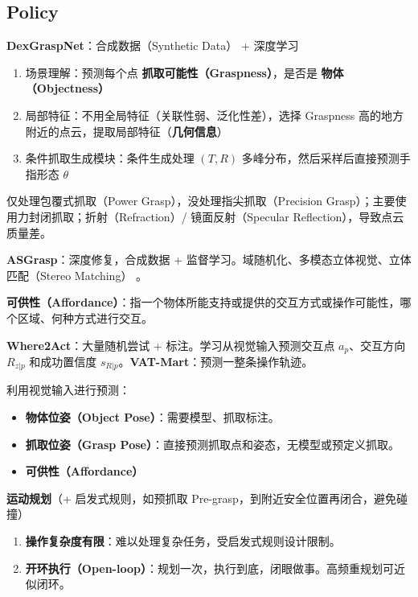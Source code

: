 \documentclass[
  8pt]{extarticle}
\author{}
\date{}
\providecommand{\tightlist}{%
  \setlength{\itemsep}{0pt}\setlength{\parskip}{0pt}}
\begin{document}
\begin{multicols*}{4}

\hypertarget{policy}{%
\section{Policy}\label{policy}}

\textbf{DexGraspNet}：合成数据（Synthetic Data） + 深度学习

\begin{enumerate}
\def\labelenumi{\arabic{enumi}.}
\tightlist
\item
  场景理解：预测每个点 \textbf{抓取可能性（Graspness）}，是否是
  \textbf{物体（Objectness）}
\item
  局部特征：不用全局特征（关联性弱、泛化性差），选择 Graspness
  高的地方附近的点云，提取局部特征（\textbf{几何信息}）
\item
  条件抓取生成模块：条件生成处理 \((T, R)\)
  多峰分布，然后采样后直接预测手指形态 \(\theta\)
\end{enumerate}

仅处理包覆式抓取（Power Grasp），没处理指尖抓取（Precision
Grasp）；主要使用力封闭抓取；折射（Refraction）/ 镜面反射（Specular
Reflection），导致点云质量差。

\textbf{ASGrasp}：深度修复，合成数据 +
监督学习。域随机化、多模态立体视觉、立体匹配（Stereo Matching） 。

\textbf{可供性（Affordance）}：指一个物体所能支持或提供的交互方式或操作可能性，哪个区域、何种方式进行交互。

\textbf{Where2Act}：大量随机尝试 + 标注。学习从视觉输入预测交互点
\(a_p\)、交互方向 \(R_{z|p}\) 和成功置信度
\(s_{R|p}\)。\textbf{VAT-Mart}：预测一整条操作轨迹。

利用视觉输入进行预测：

\begin{itemize}
\tightlist
\item
  \textbf{物体位姿（Object Pose）}：需要模型、抓取标注。
\item
  \textbf{抓取位姿（Grasp
  Pose）}：直接预测抓取点和姿态，无模型或预定义抓取。
\item
  \textbf{可供性（Affordance）}
\end{itemize}

\textbf{运动规划}（+ 启发式规则，如预抓取
Pre-grasp，到附近安全位置再闭合，避免碰撞）

\begin{enumerate}
\def\labelenumi{\arabic{enumi}.}
\tightlist
\item
  \textbf{操作复杂度有限}：难以处理复杂任务，受启发式规则设计限制。
\item
  \textbf{开环执行（Open-loop）}：规划一次，执行到底，闭眼做事。高频重规划可近似闭环。
\end{enumerate}


\end{multicols*}
\end{document}
